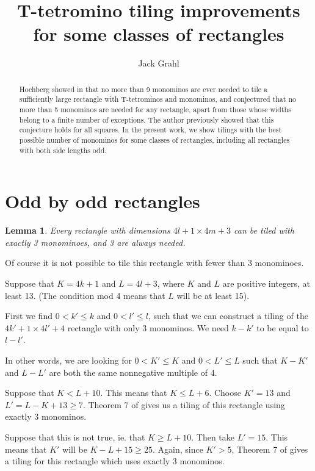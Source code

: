 \documentclass{article}
\title{T-tetromino tiling improvements for some classes of rectangles}
\author{Jack Grahl}
\theoremstyle{plain}
\newtheorem{lemma}[theorem]{Lemma}
\begin{document}
\maketitle

\begin{abstract}
Hochberg showed in \cite{hochberg} that no more than 9 monominos are ever needed to tile a sufficiently large rectangle with T-tetrominos and monominos, and conjectured that no more than 5 monominos are needed for any rectangle, apart from those whose widths belong to a finite number of exceptions.
The author previously showed that this conjecture holds for all squares.
In the present work, we show tilings with the best possible number of monominos for some classes of rectangles, including all rectangles with both side lengths odd.

\end{abstract}

\section{Odd by odd rectangles}

\begin{lemma}\label{3_times_1}
    Every rectangle with dimensions $4l + 1 \times 4m + 3$ can be tiled with exactly 3 monominoes, and 3 are always needed.
    \end{lemma}
    Of course it is not possible to tile this rectangle with fewer than 3 monominoes.
    
    Suppose that $K = 4k + 1$ and $L = 4l + 3$, where $K$ and $L$ are positive integers, at least 13. (The condition mod 4 means that $L$ will be at least 15).
    
    First we find $0 < k' \leq k$ and $0 < l' \leq l$, such that we can construct a tiling of the $4k' + 1 \times 4l' + 4$ rectangle with only 3 monominos. We need $k - k'$ to be equal to $l - l'$.
    
    In other words, we are looking for $0 < K' \leq K$ and $0 < L' \leq L$ such that $K - K'$ and $L - L'$ are both the same nonnegative multiple of 4.
    
    Suppose that $K < L + 10$. This means that $K \leq L + 6$. Choose $K' = 13$ and $L' = L - K + 13 \geq 7$. Theorem 7 of \cite{hochberg} gives us a tiling of this rectangle using exactly 3 monominos.
    
    Suppose that this is not true, ie. that $K \geq L + 10$. Then take $L' = 15$. This means that $K'$ will be $K - L + 15 \geq 25$. Again, since $K' > 5$, Theorem 7 of \cite{hochberg} gives a tiling for this rectangle which uses exactly 3 monominos.
    
\end{document}
